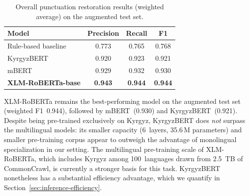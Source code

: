 \documentclass[manuscript, review]{acmart}
\begin{document}
\begin{table}[t]
\caption{Overall punctuation restoration results (weighted average) on the augmented test set.}
\label{tab:main-results}
\begin{tabular}{lccc}
\toprule
\textbf{Model} & \textbf{Precision} & \textbf{Recall} & \textbf{F1} \\
\midrule
Rule-based baseline                & 0.773          & 0.765          & 0.768 \\
KyrgyzBERT~\cite{metinov2025kyrgyzbert} & 0.920     & 0.923          & 0.921 \\
mBERT                              & 0.929          & 0.932          & 0.930 \\
\textbf{XLM-RoBERTa-base}          & \textbf{0.943} & \textbf{0.944} & \textbf{0.944} \\
\bottomrule
\end{tabular}
\end{table}

XLM-RoBERTa remains the best-performing model on the augmented test set (weighted F1~0.944), followed by mBERT~(0.930) and KyrgyzBERT~(0.921). Despite being pre-trained exclusively on Kyrgyz, KyrgyzBERT does \emph{not} surpass the multilingual models: its smaller capacity (6~layers, 35.6\,M parameters) and smaller pre-training corpus appear to outweigh the advantage of monolingual specialization in our setting. The multilingual pre-training scale of XLM-RoBERTa, which includes Kyrgyz among 100~languages drawn from 2.5~TB of CommonCrawl, is currently a stronger basis for this task. KyrgyzBERT nonetheless has a substantial efficiency advantage, which we quantify in Section~\ref{sec:inference-efficiency}.
\end{document}
